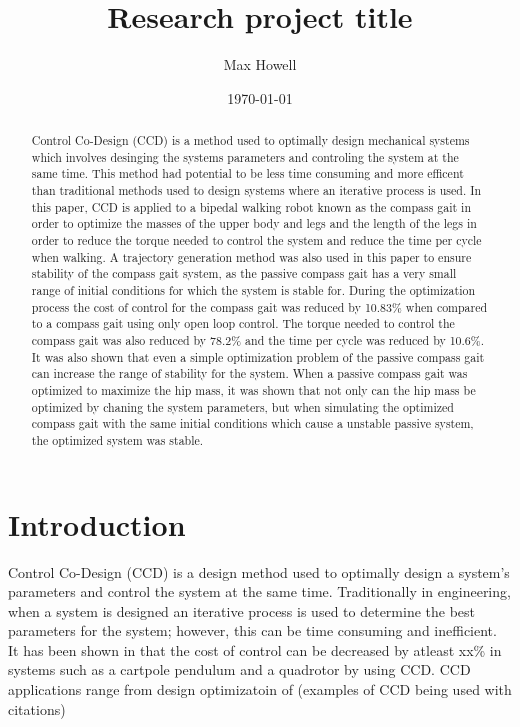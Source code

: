\documentclass[smallextended]{./springer/svjour3}
\title{Research project title}
\author{Max Howell}
\institute{University Of Tennessee Knoxville$^*$ ($^*$corresponding author),
          \email{mhowel30@vols.utk.edu} \\
        \\
          \at MABE, University of Tennessee, Knoxville,
          \at Nathan W. Dougherty Engineering Building, 1512 Middle Dr, Knoxville, TN 37916\\
}
\date{\today}
\begin{document}



\maketitle{}

\begin{abstract}

Control Co-Design (CCD) is a method used to optimally design mechanical systems which involves desinging the systems parameters and controling the system at the same time. This method 
had potential to be less time consuming and more efficent than traditional methods used to design systems where an iterative process is used. In this paper, CCD is applied to a 
bipedal walking robot known as the compass gait in order to optimize the masses of the upper body and legs and the length of the legs in order to reduce the torque needed to control 
the system and reduce the time per cycle when walking. 
A trajectory generation method was also used in this paper to ensure stability of the compass gait system, as the passive compass gait has a very small range of initial conditions for 
which the system is stable for.
During the optimization process the cost of control for the compass gait was reduced by 10.83$\%$
when compared to a compass gait using only open loop control. The torque needed to control the compass gait was also reduced by 78.2$\%$ and the time per cycle was reduced by 10.6$\%$.
It was also shown that even a simple optimization problem of the passive compass gait can increase the range of stability for the system. When a passive compass gait was optimized to maximize the hip 
mass, it was shown that not only can the hip mass be optimized by chaning the system parameters, but when simulating the optimized compass gait with 
the same initial conditions which cause a unstable passive system, the optimized system was stable.

\end{abstract}

\section{Introduction}
Control Co-Design (CCD) is a design method used to optimally design a system's parameters and control the system at the same time. Traditionally in engineering,
when a system is designed an iterative process is used to determine the best parameters for the system; however, this can be time consuming and inefficient. 
It has been shown in \cite{} that the cost of control can be decreased by atleast xx\% in systems such as a cartpole pendulum and a quadrotor by using CCD. CCD applications range
from design optimizatoin of (examples of CCD being used with citations)
\end{document}

